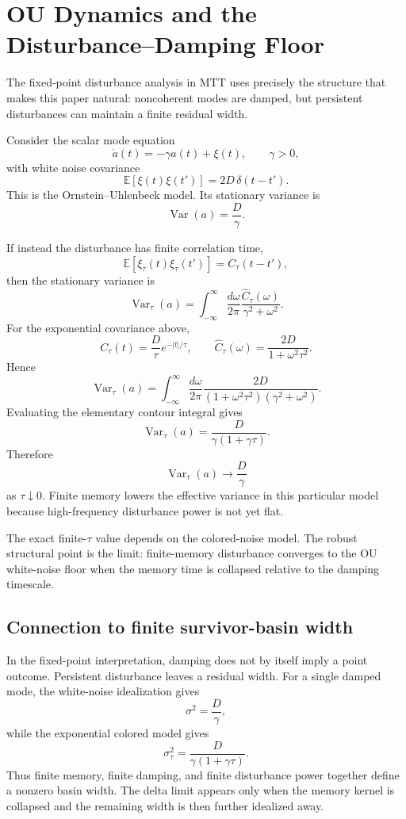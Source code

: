 \documentclass[11pt]{article}
\begin{document}
\section{OU Dynamics and the Disturbance--Damping Floor}

The fixed-point disturbance analysis in MTT uses precisely the structure that makes this paper natural: noncoherent modes are damped, but persistent disturbances can maintain a finite residual width.

Consider the scalar mode equation
\[
\dot a(t)=-\gamma a(t)+\xi(t),
\qquad \gamma>0,
\]
with white noise covariance
\[
\mathbb E[\xi(t)\xi(t')]=2D\,\delta(t-t').
\]
This is the Ornstein--Uhlenbeck model. Its stationary variance is
\[
\operatorname{Var}(a)=\frac{D}{\gamma}.
\]

If instead the disturbance has finite correlation time,
\[
\mathbb E[\xi_\tau(t)\xi_\tau(t')]=C_\tau(t-t'),
\]
then the stationary variance is
\[
\operatorname{Var}_\tau(a)
=
\int_{-\infty}^{\infty}\frac{d\omega}{2\pi}
\frac{\widehat C_\tau(\omega)}{\gamma^2+\omega^2}.
\]
For the exponential covariance above,
\[
C_\tau(t)=\frac{D}{\tau}e^{-|t|/\tau},
\qquad
\widehat C_\tau(\omega)=\frac{2D}{1+\omega^2\tau^2}.
\]
Hence
\[
\operatorname{Var}_\tau(a)
=
\int_{-\infty}^{\infty}\frac{d\omega}{2\pi}
\frac{2D}{(1+\omega^2\tau^2)(\gamma^2+\omega^2)}.
\]
Evaluating the elementary contour integral gives
\[
\operatorname{Var}_\tau(a)
=
\frac{D}{\gamma(1+\gamma\tau)}.
\]
Therefore
\[
\operatorname{Var}_\tau(a)\to \frac{D}{\gamma}
\]
as \(\tau\downarrow0\). Finite memory lowers the effective variance in this particular model because high-frequency disturbance power is not yet flat.

\begin{remark}
The exact finite-\(\tau\) value depends on the colored-noise model. The robust structural point is the limit: finite-memory disturbance converges to the OU white-noise floor when the memory time is collapsed relative to the damping timescale.
\end{remark}

\subsection{Connection to finite survivor-basin width}

In the fixed-point interpretation, damping does not by itself imply a point outcome. Persistent disturbance leaves a residual width. For a single damped mode, the white-noise idealization gives
\[
\sigma^2=\frac{D}{\gamma},
\]
while the exponential colored model gives
\[
\sigma_\tau^2=\frac{D}{\gamma(1+\gamma\tau)}.
\]
Thus finite memory, finite damping, and finite disturbance power together define a nonzero basin width. The delta limit appears only when the memory kernel is collapsed and the remaining width is then further idealized away.
\end{document}
